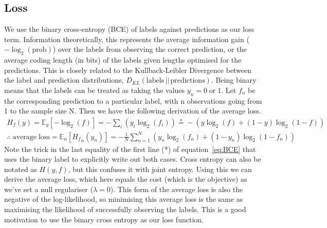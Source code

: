 \documentclass[12pt,a4paper]{article}
\begin{document}
\subsection{Loss}
\label{sec:loss}
We use the binary cross-entropy (BCE) of labels against predictions as our loss term. Information theoretically, this represents the average information gain ($-\log_2{\mathrm{(prob)}}$) over the labels from observing the correct prediction, or the average coding length (in bits) of the labels given lengths optimised for the predictions. This is closely related to the Kullback-Leibler Divergence between the label and prediction distributions, $D_{KL}(\mathrm{labels}\,\rvert\rvert\,\mathrm{predictions})$. Being binary means that the labels can be treated as taking the values $y_n = 0 \mathrm{\;or\;} 1$. Let $f_n$ be the corresponding prediction to a particular label, with n observations going from 1 to the sample size N. Then we have the following derivation of the average loss.
\begin{equation}
\label{eq:BCE}
\begin{split}
    H_f(y) = \mathbb{E}_y [- \log_2(f)] = - \sum_{i} (y_i \log_2(f_i))
    \stackrel{*}{=} - (y \log_2(f) + (1-y) \log_2(1-f)) \\
    \therefore\; \mathrm{average\; loss} = \mathbb{E}_n [{H_f}_n(y_n)] = -\frac{1}{N} \sum_{n=1}^N (y_n \log_2(f_n) + (1-y_n) \log_2(1-f_n))    
\end{split}
\end{equation}
Note the trick in the last equality of the first line (*) of equation~\ref{eq:BCE} that uses the binary label to explicitly write out both cases. Cross entropy can also be notated as $H(y,f)$, but this confuses it with joint entropy. Using this we can derive the average loss, which here equals the cost (which is the objective) as we've set a null regulariser ($\lambda=0$). This form of the average loss is also the negative of the log-likelihood, so minimising this average loss is the same as maximising the likelihood of successfully observing the labels. This is a good motivation to use the binary cross entropy as our loss function.\\
\end{document}
